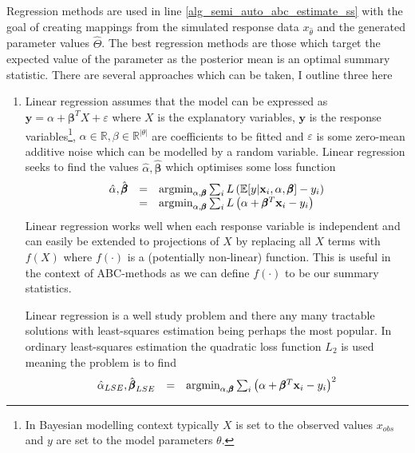 \documentclass[11pt,a4paper]{article}
\newcommand*{\expect}{\mathbb{E}}
\theoremstyle{break}
\begin{document}
  \par Regression methods are used in line \ref{alg_semi_auto_abc_estimate_ss} with the goal of creating mappings from the simulated response data $x_{\hat\theta}$ and the generated parameter values $\hat\Theta$. The best regression methods are those which target the expected value of the parameter as the posterior mean is an optimal summary statistic. There are several approaches which can be taken, I outline three here
  \begin{enumerate} %
    \everymath={\displaystyle}
    \item Linear regression \cite[]{constructing_summary_statistics_for_approximate_bayesian_computation_semi_automatic_ABC} assumes that the model can be expressed as $\mathbf{y}=\alpha+\pmb\beta^T X+\varepsilon$ where $X$ is the explanatory variables, $\mathbf{y}$ is the response variables\footnote{In Bayesian modelling context typically $X$ is set to the observed values $x_{obs}$ and $y$ are set to the model parameters $\theta$.}, $\alpha\in\mathbb{R},\beta\in\mathbb{R}^{|\theta|}$ are coefficients to be fitted and $\varepsilon$ is some zero-mean additive noise which can be modelled by a random variable. Linear regression seeks to find the values $\hat\alpha,\hat{\pmb\beta}$ which optimises some loss function
    \[\begin{array}{rcl}
      \everymath={\displaystyle}
      \hat\alpha,\hat{\pmb\beta}&=&\text{argmin}_{\alpha,\pmb\beta}\sum_i L\left(\expect[y|\mathbf{x}_i,\alpha,\pmb\beta]-y_i\right)\\
      &=&\text{argmin}_{\alpha,\pmb\beta}\sum_i L\left(\alpha+\pmb\beta^T\mathbf{x}_i-y_i\right)
    \end{array}\]
    Linear regression works well when each response variable is independent and  can easily be extended to projections of $X$ by replacing all $X$ terms with $f(X)$ where $f(\cdot)$ is a (potentially non-linear) function. This is useful in the context of ABC-methods as we can define $f(\cdot)$ to be our summary statistics.
    \par Linear regression is a well study problem and there any many tractable solutions with least-squares estimation being perhaps the most popular. In ordinary least-squares estimation the quadratic loss function $L_2$ is used meaning the problem is to find
    \[\begin{array}{rcl}
      \everymath={\displaystyle}
      \hat\alpha_{LSE},\hat{\pmb\beta}_{LSE}&=&\text{argmin}_{\alpha,\pmb\beta}\sum_i \left(\alpha+\pmb\beta^T\mathbf{x}_i-y_i\right)^2\\

\end{array}\]
\end{enumerate}
\end{document}
